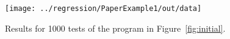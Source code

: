 \documentclass{sigplanconf}
\newenvironment{code}{\begin{alltt}\footnotesize}{\end{alltt}}
\newcommand{\ttp}[1]{\texttt{#1}}
\begin{document}




%


%

\begin{figure}[ht]
\texttt{[image: ../regression/PaperExample1/out/data]}
  \caption{Results for 1000 tests of the program in Figure~\ref{fig:initial}.}
  \label{fig:graphs}
\end{figure}
\end{document}
